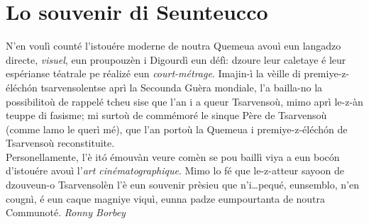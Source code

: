 \section*{Lo souvenir di Seunteucco}
\og N'en voulì counté l'istouére moderne de noutra Quemeua avouì eun langadzo directe, \textit{visuel}, eun proupouzèn i Digourdì eun défì: dzoure leur caletaye é leur espérianse téatrale pe réalizé eun \textit{court-métrage}. Imajin-ì la vèille di premiye-z-éléch\'on tsarvensolentse aprì la Secounda Guèra mondiale, l'a bailla-no la possibilitoù de rappelé tcheu sise que l'an i a queur Tsarvensoù, mimo aprì le-z-àn teuppe di fasisme; mi surtoù de commémoré le sinque Père de Tsarvensoù (comme lamo le querì mé), que l'an portoù la Quemeua i premiye-z-éléch\'on de Tsarvensoù reconstituite.
\\Personellamente, l'è it\'o émouvàn veure comèn se pou baillì viya a eun boc\'on d'istouére avouì l'\textit{art cinématographique}. Mimo lo fé que le-z-atteur sayoon de dzouveun-o Tsarvensolèn l'è eun souvenir prèsieu que n'i\ldots pequé, eunsemblo, n'en cougnì, é eun caque magniye viquì, eunna padze eumpourtanta de noutra Communoté.
\fg{}
\newline
\newline
\hspace*{\fill} \textit{Ronny Borbey}

%
